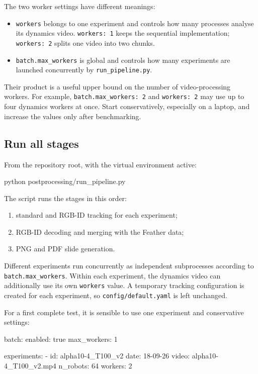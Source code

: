 \documentclass[11pt,a4paper]{article}
\begin{document}
The two worker settings have different meanings:

\begin{itemize}
  \item \texttt{workers} belongs to one experiment and controls how many processes analyse its dynamics video. \texttt{workers: 1} keeps the sequential implementation; \texttt{workers: 2} splits one video into two chunks.
  \item \texttt{batch.max\_workers} is global and controls how many experiments are launched concurrently by \texttt{run\_pipeline.py}.
\end{itemize}

Their product is a useful upper bound on the number of video-processing workers. For example, \texttt{batch.max\_workers: 2} and \texttt{workers: 2} may use up to four dynamics workers at once. Start conservatively, especially on a laptop, and increase the values only after benchmarking.

\subsection{Run all stages}

From the repository root, with the virtual environment active:

\begin{codeblock}
python postprocessing/run_pipeline.py
\end{codeblock}

The script runs the stages in this order:
\begin{enumerate}
  \item standard and RGB-ID tracking for each experiment;
  \item RGB-ID decoding and merging with the Feather data;
  \item PNG and PDF slide generation.
\end{enumerate}

Different experiments run concurrently as independent subprocesses according to \texttt{batch.max\_workers}. Within each experiment, the dynamics video can additionally use its own \texttt{workers} value. A temporary tracking configuration is created for each experiment, so \texttt{config/default.yaml} is left unchanged.

For a first complete test, it is sensible to use one experiment and conservative settings:

\begin{codeblock}
batch:
  enabled: true
  max_workers: 1

experiments:
  - id: alpha10-4_T100_v2
    date: 18-09-26
    video: alpha10-4_T100_v2.mp4
    n_robots: 64
    workers: 2
\end{codeblock}
\end{document}

